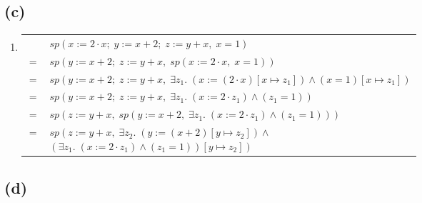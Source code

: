 \documentclass[12pt]{scrartcl}
\begin{document}
	\subsection*{(c)}
	
	\begin{enumerate}
	\item[] 
	\begin{tabular}{cl}
	    & $sp\left(x:=2\cdot x;\;y:=x+2;\;z:=y+x,\;x=1\right)$\\
	$=$ & $sp\left(y:=x+2;\;z:=y+x,\;sp\left(x:=2\cdot x,\;x=1\right)\right)$\\
	$=$ & $sp\left(y:=x+2;\;z:=y+x,\;\exists z_{1}.\;\left(x:=\left(2\cdot x\right)\left[x\mapsto z_{1}\right]\right)\wedge \left(x=1\right)\left[x\mapsto z_{1}\right]\right)$\\
	$=$ & $sp\left(y:=x+2;\;z:=y+x,\;\exists z_{1}.\;\left(x:=2\cdot z_{1}\right)\wedge \left(z_{1}=1\right)\right)$\\
	$=$ & $sp\left(z:=y+x,\;sp\left(y:=x+2,\;\exists z_{1}.\;\left(x:=2\cdot z_{1}\right)\wedge \left(z_{1}=1\right)\right)\right)$\\
	$=$ & \parbox[t]{10cm}{$sp\left(z:=y+x,\;\exists z_{2}.\;\left(y:=\left(x+2\right)\left[y\mapsto z_{2}\right]\right)\wedge\right.$\\$\left.\left(\exists z_{1}.\;\left(x:=2\cdot z_{1}\right)\wedge \left(z_{1}=1\right)\right)\left[y\mapsto z_{2}\right]\right)$}\\
	$=$ & $sp\left(z:=y+x,\;\exists z_{2}.\;\left(y:=\left(x+2\right)\right)\wedge\left(\exists z_{1}.\;\left(x:=2\cdot z_{1}\right)\wedge \left(z_{1}=1\right)\right)\right)$\\
	$=$ & \parbox[t]{10cm}{$\exists z_{3}.\;\left(z:=\left(y+x\right)\left[z\mapsto z_{3}\right]\right)\wedge$\\$\left(\exists z_{2}.\;\left(y:=\left(x+2\right)\right)\wedge\left(\exists z_{1}.\;\left(x:=2\cdot z_{1}\right)\wedge \left(z_{1}=1\right)\right)\right)\left[z\mapsto z_{3}\right]$}\\
	$=$ & $\exists z_{3}.\;\left(z:=\left(y+x\right)\right)\wedge\left(\exists z_{2}.\;\left(y:=\left(x+2\right)\right)\wedge\left(\exists z_{1}.\;\left(x:=2\cdot z_{1}\right)\wedge \left(z_{1}=1\right)\right)\right)$
	\end{tabular}
	\end{enumerate}
	\newpage
	\subsection*{(d)}
	
\end{document}
